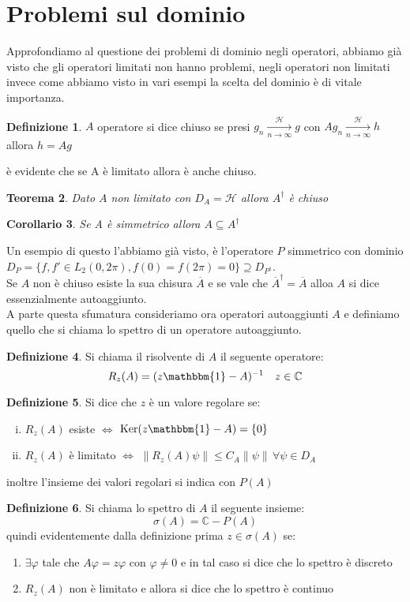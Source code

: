 \documentclass[12pt]{book}
\theoremstyle{plain}
\newcommand{\C}{\mathbb{C}}
\renewcommand{\H}{\mathcal{H}}
\newtheorem{thm}{Teorema}[section]
\newtheorem{coro}[thm]{Corollario}
\theoremstyle{definition}
\newtheorem{dfn}[thm]{Definizione}
\theoremstyle{remark}
\begin{document}
\section{Problemi sul dominio}
Approfondiamo al questione dei problemi di dominio negli operatori, abbiamo già visto che gli operatori limitati non hanno problemi, negli operatori non limitati invece come abbiamo visto in vari esempi la scelta del dominio è di vitale importanza.
\begin{dfn}
$A$ operatore si dice chiuso se presi $g_n\xrightarrow[n\to \infty]{\H}g$ con $Ag_n\xrightarrow[n\to \infty]{\H}h$ allora $h=Ag$
\end{dfn}
è evidente che se A è limitato allora è anche chiuso.
\begin{thm}
Dato $A$ non limitato con $D_A =\H$ allora $A^\dagger$ è chiuso
\end{thm}
\begin{coro}
Se A è simmetrico allora $A\subseteq A^\dagger$
\end{coro}
Un esempio di questo l'abbiamo già visto, è l'operatore $P$ simmetrico con dominio $D_P=\{f,f'\in L_2(0,2\pi),f(0) = f(2\pi) = 0\}\supseteq D_{P^\dagger}$.\\
Se $A$ non è chiuso esiste la sua chisura $\overline{A}$ e se vale che $\overline{A}^\dagger = \overline{A}$ alloa $A$ si dice essenzialmente autoaggiunto.\\
A parte questa sfumatura consideriamo ora operatori autoaggiunti $A$ e definiamo quello che si chiama lo spettro di un operatore autoaggiunto.
\begin{dfn}
Si chiama il risolvente di $A$ il seguente operatore:
\[R_z(A) = (z\mathbbm{1}-A)^{-1}\quad z\in\C\]
\end{dfn}
\begin{dfn}
Si dice che $z$ è un valore regolare se:
\begin{enumerate}[i.]
\item $R_z(A)$ esiste $\iff$ $\text{Ker}(z\mathbbm{1}-A) = \{0\}$
\item $R_z(A)$ è limitato $\iff$ $\|R_z(A)\psi\|\leq C_A \|\psi\|\, \forall \psi \in D_A$
\end{enumerate}
inoltre l'insieme dei valori regolari si indica con $P(A)$
\end{dfn}
\begin{dfn}
\label{spettro}
Si chiama lo spettro di $A$ il seguente insieme:
\[\sigma(A) = \C-P(A)\]
quindi evidentemente dalla definizione prima $z\in\sigma(A)$ se:
\begin{enumerate}
\item $\exists \varphi$ tale che $A\varphi = z\varphi$ con $\varphi\neq 0$ e in tal caso si dice che lo spettro è discreto
\item $R_z(A)$ non è limitato e allora si dice che lo spettro è continuo
\end{enumerate}
\end{dfn}
\end{document}
